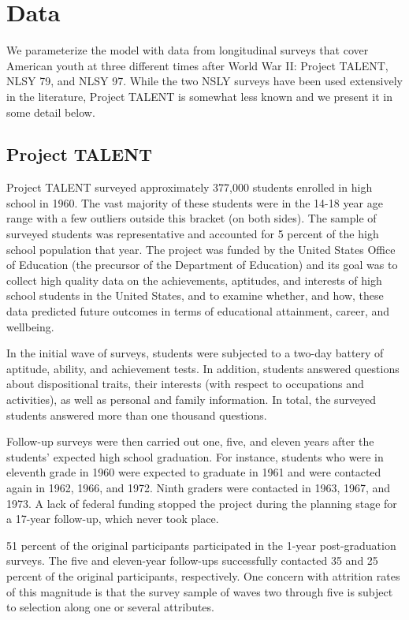 \documentclass[onehalfspacing,11pt]{article}
\begin{document}
	\section{Data}\label{sec:data}
	
	We parameterize the model with data from longitudinal surveys that cover American youth at three different times after World War II: Project TALENT, NLSY 79, and NLSY 97. While the two NSLY surveys have been used extensively in the literature, Project TALENT is somewhat less known and we present it in some detail below.
	\subsection{Project TALENT}
	
	Project TALENT surveyed approximately 377,000 students enrolled in high school in 1960. The vast majority of these students were in the 14-18 year age range with a few outliers outside this bracket (on both sides). The sample of surveyed students was representative and accounted for 5 percent of the high school population that year. The project was funded by the United States Office of Education (the precursor of the Department of Education) and its goal was to collect high quality data on the achievements, aptitudes, and interests of high school students in the United States, and to examine whether, and how, these data predicted future outcomes in terms of educational attainment, career, and wellbeing.
	
	In the initial wave of surveys, students were subjected to a two-day battery of aptitude, ability, and achievement tests. In addition, students answered questions about dispositional traits, their interests (with respect to occupations and activities), as well as personal and family information. 	In total, the surveyed students answered more than one thousand questions.
	
	Follow-up surveys were then carried out one, five, and eleven years after the students' expected high school graduation. For instance, students who were in eleventh grade in 1960 were expected to graduate in 1961 and were contacted again in 1962, 1966, and 1972. Ninth graders were contacted in 1963, 1967, and 1973. A lack of federal funding stopped the project during the planning stage for a 17-year follow-up, which never took place.
	
	51 percent of the original participants participated in the 1-year post-graduation surveys. The five and eleven-year follow-ups successfully contacted 35 and 25 percent of the original participants, respectively. One concern with attrition rates of this magnitude is that the survey sample of waves two through five is subject to selection along one or several attributes.
	
\end{document}

